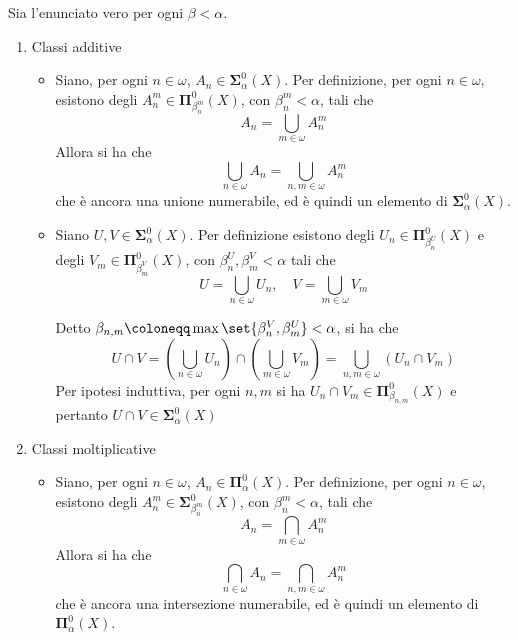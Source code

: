 \documentclass{article}
\newcommand{\1}{\mathds{1}}
\begin{document}
Sia l'enunciato vero per ogni \(\beta<\alpha\).
\begin{enumerate}
\item Classi additive
\label{sec:orge7d0112}

\begin{itemize}
\item Siano, per ogni \(n \in\omega\), \(A_{n} \in \bm{\Sigma}^0_\alpha(X)\). Per definizione, per ogni \(n \in\omega\), esistono degli \(A_{n}^{m} \in \bm{\Pi}^0_{\beta_{n}^{m}}(X)\), con \(\beta_{n}^{m}<\alpha\), tali che
\begin{equation*}
  A_{n} = \bigcup_{m \in \omega} A_{n}^{m}
\end{equation*}
Allora si ha che
\begin{equation*}
  \bigcup_{n \in \omega} A_{n} = \bigcup_{n,m \in \omega} A_{n}^{m}
\end{equation*}
che è ancora una unione numerabile, ed è quindi un elemento di \(\bm{\Sigma}^0_\alpha(X)\).

\item Siano \(U, V \in \bm{\Sigma}^0_\alpha(X)\). Per definizione esistono degli \(U_{n} \in \bm{\Pi}^0_{\beta^{U}_{n}}(X)\) e degli \(V_{m} \in \bm{\Pi}^0_{\beta^{V}_{m}}(X)\), con \(\beta_{n}^{U}, \beta_{m}^{V} <\alpha\) tali che
\begin{equation*}
  U = \bigcup_{n \in \omega} U_{n},\quad V = \bigcup_{m \in \omega} V_{m}
\end{equation*}

Detto \(\beta_{n,m} \coloneqq \max\set{\beta_{n}^{V},\beta_{m}^{U}}<\alpha\), si ha che
\begin{equation*}
  U\cap V = \left(\bigcup_{n \in\omega} U_{n}\right)\cap\left(\bigcup_{m \in \omega} V_{m}\right) = \bigcup_{n,m \in \omega} (U_{n}\cap V_{m})
\end{equation*}
Per ipotesi induttiva, per ogni \(n,m\) si ha \(U_{n}\cap V_{m} \in \bm{\Pi}^0_{\beta_{n,m}}(X)\) e pertanto \(U\cap V \in \bm{\Sigma}^0_\alpha(X)\)
\end{itemize}
\item Classi moltiplicative
\label{sec:orga716f9c}

\begin{itemize}
\item Siano, per ogni \(n \in\omega\), \(A_{n} \in \bm{\Pi}^0_\alpha(X)\). Per definizione, per ogni \(n \in\omega\), esistono degli \(A_{n}^{m} \in \bm{\Sigma}^0_{\beta_{n}^{m}}(X)\), con \(\beta_{n}^{m}<\alpha\), tali che
\begin{equation*}
  A_{n} = \bigcap_{m \in \omega} A_{n}^{m}
\end{equation*}
Allora si ha che
\begin{equation*}
  \bigcap_{n \in \omega} A_{n} = \bigcap_{n,m \in \omega} A_{n}^{m}
\end{equation*}
che è ancora una intersezione numerabile, ed è quindi un elemento di \(\bm{\Pi}^0_\alpha(X)\).


\end{itemize}
\end{enumerate}
\end{document}
